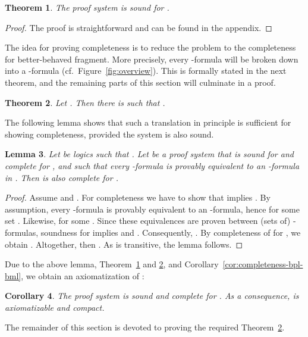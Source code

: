\documentclass[a4paper,english,fleqn,11pt,final]{scrartcl}
\theoremstyle{plain}
\newtheorem{theorem}{Theorem}[section]
\newtheorem{lemma}[theorem]{Lemma}
\newtheorem{corollary}[theorem]{Corollary}
\theoremstyle{definition}
\begin{document}
\bigskip

\begin{theorem}\label{thm:ptl-soundness}
The proof system  is sound for .
\end{theorem}
\begin{proof}
The proof is straightforward and can be found in the appendix.
\end{proof}

The idea for proving completeness is to reduce the problem to the completeness for better-behaved fragment.
More precisely, every -formula will be broken down into a -formula (cf.\ Figure~\ref{fig:overview}).
This is formally stated in the next theorem, and the remaining parts of this section will culminate in a proof.

\begin{theorem}\label{thm:ptl-to-bpl-equiv}
Let .
Then there is  such that .
\end{theorem}

The following lemma shows that such a translation in principle is sufficient for showing completeness, provided the system is also sound.

\begin{lemma}\label{lem:translate-completeness}
Let  be logics such that .
Let  be a proof system that is sound for  and complete for , and such that every -formula is provably equivalent to an -formula in .
Then  is also complete for .
\end{lemma}
\begin{proof}
Assume  and .
For completeness we have to show that  implies .
By assumption, every -formula is provably equivalent to an -formula, hence  for some set .
Likewise,  for some .
Since these equivalences are proven between (sets of) -formulas, soundness for  implies  and .
Consequently, .
By completeness of  for , we obtain .
Altogether, then .
As  is transitive, the lemma follows.
\end{proof}

Due to the above lemma, Theorem~\ref{thm:ptl-soundness} and \ref{thm:ptl-to-bpl-equiv}, and Corollary~\ref{cor:completeness-bpl-bml}, we obtain an axiomatization of :

\begin{corollary}\label{cor:ptl-completeness}
The proof system  is sound and complete for .
As a consequence,  is axiomatizable and compact.
\end{corollary}

The remainder of this section is devoted to proving the required Theorem~\ref{thm:ptl-to-bpl-equiv}.
\end{document}

